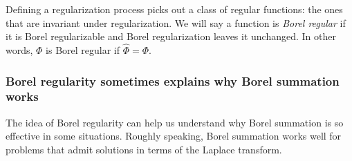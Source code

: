 \documentclass[pdftex]{sigma}
\numberwithin{equation}{section}
\begin{document}
Defining a regularization process picks out a class of regular functions: the ones that are invariant under regularization. We will say a function is {\em Borel regular} if it is Borel regularizable and Borel regularization leaves it unchanged. In other words, $\Phi$ is Borel regular if $\hat{\Phi} = \Phi$.

\subsubsection{Borel regularity sometimes explains why Borel summation works}\label{borel-reg:explanatory-power}
The idea of Borel regularity can help us understand why Borel summation is so effective in some situations. Roughly speaking, Borel summation works well for problems that admit solutions in terms of the Laplace transform.
\end{document}

